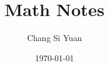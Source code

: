 \documentclass[a4paper]{article}
\author{Chang Si Yuan}
\title{Math Notes}
\date{\today}
\begin{document}
\maketitle

\begin{multicols}{2}





% 
% 

\end{multicols}
\end{document}
